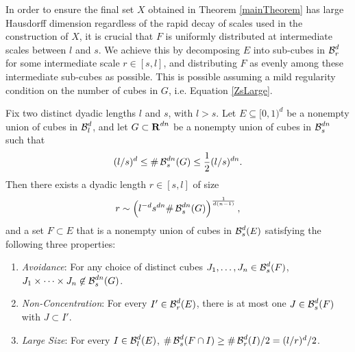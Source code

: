 In order to ensure the final set $X$ obtained in Theorem \ref{mainTheorem} has large Hausdorff dimension regardless of the rapid decay of scales used in the construction of $X$, it is crucial that $F$ is uniformly distributed at intermediate scales between $l$ and $s$.
%
We achieve this by decomposing $E$ into sub-cubes in $\operatorname{\mathcal{B}}^d_r$ for some intermediate scale $r \in [s,l]$, and distributing $F$ as evenly among these intermediate sub-cubes as possible. This is possible assuming a mild regularity condition on the number of cubes in $G$, i.e. Equation \eqref{ZsLarge}.
%

\begin{lemma} \label{discretelemma}
	Fix two distinct dyadic lengths $l$ and $s$, with $l > s$. Let $E \subseteq [0,1)^d$ be a nonempty union of cubes in $\operatorname{\mathcal{B}}^d_l$, and let $G\subset\operatorname{\mathbf{R}}^{dn}$ be a nonempty union of cubes in $\operatorname{\mathcal{B}}_s^{dn}$ such that
	\begin{equation}\label{ZsLarge}
		(l/s)^d \leq \# \operatorname{\mathcal{B}}^{dn}_s(G)  \leq \frac{1}{2}(l/s)^{dn}.
	\end{equation} 
	Then there exists a dyadic length $r \in [s,l]$ of size
	\begin{equation} \label{rBound}
	 	r \sim \left( l^{-d}s^{dn} \# \operatorname{\mathcal{B}}^{dn}_s(G) \right)^{\frac{1}{d(n-1)}},
	\end{equation}
	and a set $F \subset E$ that is a nonempty union of cubes in $\operatorname{\mathcal{B}}^d_s(E)$ satisfying the following three properties:
	\begin{enumerate}
		\item\label{avoidanceItem} \emph{Avoidance}: For any choice of distinct cubes $J_1, \dots, J_n \in \operatorname{\mathcal{B}}^d_s(F)$, $J_1 \times \dots \times J_n \not \in \operatorname{\mathcal{B}}_s^{dn}(G)$.

		\item\label{nonConcentrationItem} \emph{Non-Concentration}: For every $I' \in \operatorname{\mathcal{B}}_r^d(E)$, there is at most one $J \in \operatorname{\mathcal{B}}_s^d(F)$ with $J \subset I'$.

		\item\label{largeSizeItem} \emph{Large Size}: For every $I \in \operatorname{\mathcal{B}}^d_l(E)$, $\# \operatorname{\mathcal{B}}^d_s(F \cap I) \geq \# \operatorname{\mathcal{B}}^d_r(I) / 2 = (l/r)^d / 2$.
	\end{enumerate}
\end{lemma}

